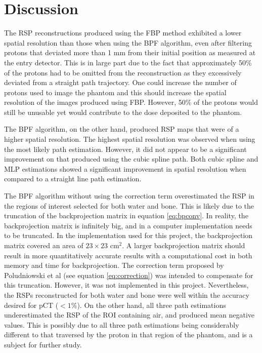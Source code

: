 \documentclass[11pt,a4paper]{article}
\begin{document}

\section{Discussion}
The RSP reconstructions produced using the FBP method exhibited a lower spatial resolution than those when using the BPF algorithm, even after filtering protons that deviated more than 1 mm from their initial position as measured at the entry detector. This is in large part due to the fact that approximately 50\% of the protons had to be omitted from the reconstruction as they excessively deviated from a straight path trajectory. One could increase the number of protons used to image the phantom and this should increase the spatial resolution of the images produced using FBP. However, 50\% of the protons would still be unusable yet would contribute to the dose deposited to the phantom.

The BPF algorithm, on the other hand, produced RSP maps that were of a higher spatial resolution. The highest spatial resolution was observed when using the most likely path estimation. However, it did not appear to be a significant improvement on that produced using the cubic spline path. Both cubic spline and MLP estimations showed a significant improvement in spatial resolution when compared to a straight line path estimation.

The BPF algorithm without using the correction term overestimated the RSP in the regions of interest selected for both water and bone. This is likely due to the truncation of the backprojection matrix in equation \ref{eq:bpconv}. In reality, the backprojection matrix is infinitely big, and in a computer implementation needs to be truncated. In the implementation used for this project, the backprojection matrix covered an area of $23 \times 23$ cm$^2$. A larger backprojection matrix should result in more quantitatively accurate results with a computational cost in both memory and time for backprojection. The correction term proposed by Poludniowski et al \cite{poludniowski2014proton} (see equation \ref{eq:correction}) was intended to compensate for this truncation. However, it was not implemented in this project. Nevertheless, the RSPs reconstructed for both water and bone were well within the accuracy desired for pCT ($< 1$\%). On the other hand, all three path estimations underestimated the RSP of the ROI containing air, and produced mean negative values. This is possibly due to all three path estimations being considerably different to that traversed by the proton in that region of the phantom, and is a subject for further study.
\end{document}
